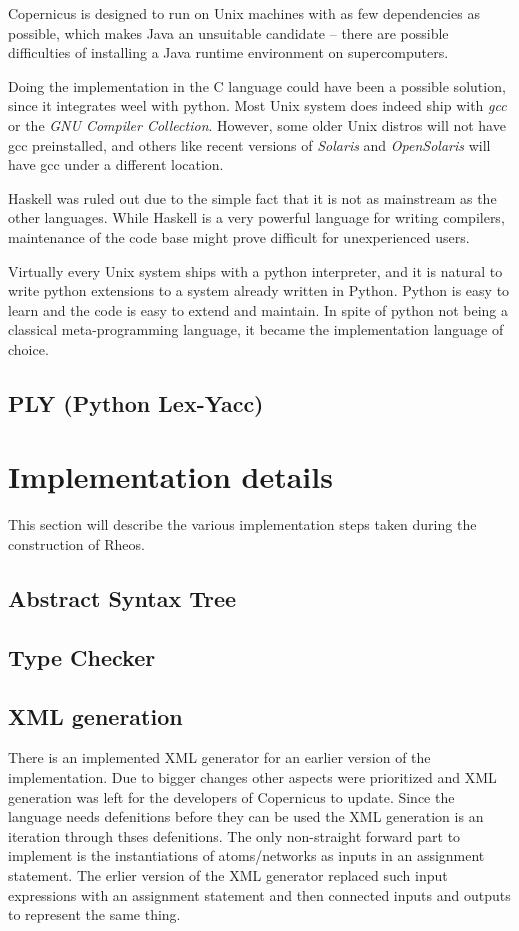 Copernicus is designed to run on Unix machines with as few
dependencies as possible, which makes Java an unsuitable candidate --
there are possible difficulties of installing a Java runtime
environment on supercomputers.

Doing the implementation in the C language could have been a possible
solution, since it integrates weel with python. Most Unix system does
indeed ship with \emph{gcc} or the \emph{GNU Compiler
  Collection}. However, some older Unix distros will not have gcc
preinstalled, and others like recent versions of \emph{Solaris} and
\emph{OpenSolaris} will have gcc under a different location.

Haskell was ruled out due to the simple fact that it is not as
mainstream as the other languages. While Haskell is a very powerful
language for writing compilers, maintenance of the code base might
prove difficult for unexperienced users.

Virtually every Unix system ships with a python interpreter, and it is
natural to write python extensions to a system already written in
Python. Python is easy to learn and the code is easy to extend and
maintain. In spite of python not being a classical meta-programming
language, it became the implementation language of choice.


\subsection{PLY (Python Lex-Yacc)}\label{sec:ply}



\section{Implementation details}
This section will describe the various implementation steps taken
during the construction of Rheos.

\subsection{Abstract Syntax Tree}\label{sec:ast}



\subsection{Type Checker}\label{sec:typechecker}


\subsection{XML generation}\label{sec:xml}
There is an implemented XML generator for an earlier version of the
implementation. Due to bigger changes other aspects were prioritized
and XML generation was left for the developers of Copernicus to
update. Since the language needs defenitions before they can be used
the XML generation is an iteration through thses defenitions. The only
non-straight forward part to implement is the instantiations of
atoms/networks as inputs in an assignment statement. The erlier
version of the XML generator replaced such input expressions with an
assignment statement and then connected inputs and outputs to
represent the same thing.

